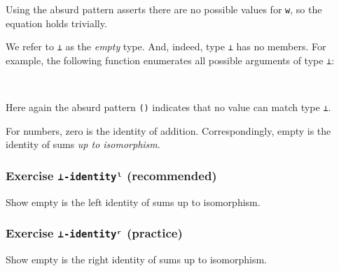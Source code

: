 Using the absurd pattern asserts there are no possible values for
\texttt{w}, so the equation holds trivially.

We refer to \texttt{⊥} as the \emph{empty} type. And, indeed, type
\texttt{⊥} has no members. For example, the following function
enumerates all possible arguments of type \texttt{⊥}:

\begin{fence}
\begin{code}%
\>[0]\AgdaSpace{}%
\AgdaSymbol{:}\AgdaSpace{}%
\AgdaSpace{}%
\AgdaSpace{}%
\<%
\\
\>[0]\AgdaSpace{}%
\AgdaSymbol{()}\<%
\end{code}
\end{fence}

Here again the absurd pattern \texttt{()} indicates that no value can
match type \texttt{⊥}.

For numbers, zero is the identity of addition. Correspondingly, empty is
the identity of sums \emph{up to isomorphism}.

\hypertarget{exercise--identityux2e1-recommended}{%
\subsubsection{\texorpdfstring{Exercise \texttt{⊥-identityˡ}
(recommended)}{Exercise ⊥-identityˡ (recommended)}}\label{exercise--identityux2e1-recommended}}

Show empty is the left identity of sums up to isomorphism.

\begin{fence}
\begin{code}%
\>[0]\<%
\end{code}
\end{fence}

\hypertarget{exercise--identityux2b3-practice}{%
\subsubsection{\texorpdfstring{Exercise \texttt{⊥-identityʳ}
(practice)}{Exercise ⊥-identityʳ (practice)}}\label{exercise--identityux2b3-practice}}

Show empty is the right identity of sums up to isomorphism.

\begin{fence}
\begin{code}%
\>[0]\<%
\end{code}
\end{fence}

